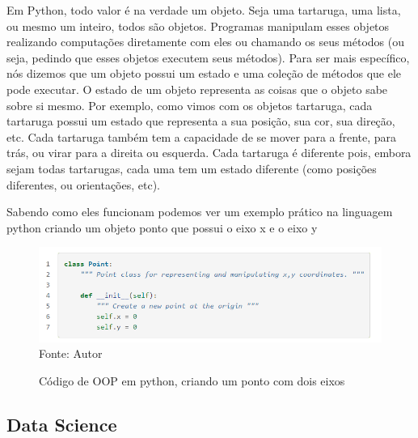         Em Python, todo valor é na verdade um objeto. Seja uma tartaruga, uma lista, ou mesmo um inteiro, todos são objetos. Programas manipulam esses objetos realizando computações diretamente com eles ou chamando os seus métodos (ou seja, pedindo que esses objetos executem seus métodos). Para ser mais específico, nós dizemos que um objeto possui um estado e uma coleção de métodos que ele pode executar. O estado de um objeto representa as coisas que o objeto sabe sobre si mesmo. Por exemplo, como vimos com os objetos tartaruga, cada tartaruga possui um estado que representa a sua posição, sua cor, sua direção, etc. Cada tartaruga também tem a capacidade de se mover para a frente, para trás, ou virar para a direita ou esquerda. Cada tartaruga é diferente pois, embora sejam todas tartarugas, cada uma tem um estado diferente (como posições diferentes, ou orientações, etc).
        
        Sabendo como eles funcionam podemos ver um exemplo prático na linguagem python criando um objeto ponto que possui o eixo x e o eixo y
        
    \begin{figure}[H]
    \begin{center}
        \caption{Código de OOP em python, criando um ponto com dois eixos} \label{ling1}
        \includegraphics[width=12cm]{Pictures/poo-python.png} \\
        {\tiny \sf Fonte: Autor }
    \end{center}
   \end{figure}        

        \subsection{ Data Science }